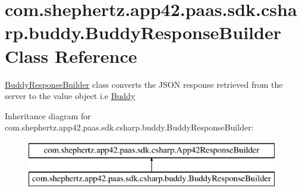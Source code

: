 \hypertarget{classcom_1_1shephertz_1_1app42_1_1paas_1_1sdk_1_1csharp_1_1buddy_1_1_buddy_response_builder}{\section{com.\+shephertz.\+app42.\+paas.\+sdk.\+csharp.\+buddy.\+Buddy\+Response\+Builder Class Reference}
\label{classcom_1_1shephertz_1_1app42_1_1paas_1_1sdk_1_1csharp_1_1buddy_1_1_buddy_response_builder}
}


\hyperlink{classcom_1_1shephertz_1_1app42_1_1paas_1_1sdk_1_1csharp_1_1buddy_1_1_buddy_response_builder}{Buddy\+Response\+Builder} class converts the J\+S\+O\+N response retrieved from the server to the value object i.\+e \hyperlink{classcom_1_1shephertz_1_1app42_1_1paas_1_1sdk_1_1csharp_1_1buddy_1_1_buddy}{Buddy}  


Inheritance diagram for com.\+shephertz.\+app42.\+paas.\+sdk.\+csharp.\+buddy.\+Buddy\+Response\+Builder\+:\begin{figure}[H]
\begin{center}
\leavevmode
\includegraphics[height=2.000000cm]{classcom_1_1shephertz_1_1app42_1_1paas_1_1sdk_1_1csharp_1_1buddy_1_1_buddy_response_builder}
\end{center}
\end{figure}

